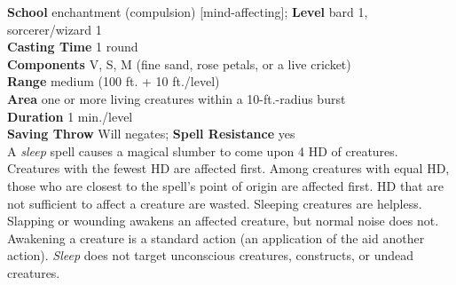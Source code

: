 \textbf{School} enchantment (compulsion) [mind-affecting]; \textbf{Level} bard 1, sorcerer/wizard 1\\
\textbf{Casting Time} 1 round\\
\textbf{Components} V, S, M (fine sand, rose petals, or a live cricket)\\
\textbf{Range }medium (100 ft. + 10 ft./level)\\
\textbf{Area} one or more living creatures within a 10-ft.-radius burst\\
\textbf{Duration} 1 min./level\\
\textbf{Saving Throw }Will negates; \textbf{Spell Resistance} yes\\
A \textit{sleep }spell causes a magical slumber to come upon 4 HD of creatures. Creatures with the fewest HD are affected first. Among creatures with equal HD, those who are closest to the spell's point of origin are affected first. HD that are not sufficient to affect a creature are wasted. Sleeping creatures are helpless. Slapping or wounding awakens an affected creature, but normal noise does not. Awakening a creature is a standard action (an application of the aid another action). \textit{Sleep }does not target unconscious creatures, constructs, or undead creatures.\\
